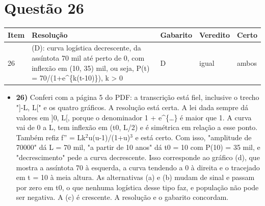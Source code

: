 \documentclass{article}%
\begin{document}
\section*{Questão 26}%
\begin{longtable}{@{}p{} p{} p{} p{} p{}@{}}\toprule Item & Resolução & Gabarito & Veredito & Certo \\ \midrule
26 & (D): curva logística decrescente, da assíntota 70 mil até perto de 0, com inflexão em (10, 35) mil, ou seja, P(t) = 70/(1+e\^{}\{k(t-10)\}), k > 0 & D & igual & ambos \\
\bottomrule\end{longtable}%
\begin{itemize}%
\item%
\textbf{26)} Conferi com a página 5 do PDF: a transcrição está fiel, inclusive o trecho "{]}-L, L{[}" e os quatro gráficos. A resolução está certa. A lei dada sempre dá valores em {]}0, L{[}, porque o denominador 1 + e\^{}\{\ldots{}\} é maior que 1. A curva vai de 0 a L, tem inflexão em (t0, L/2) e é simétrica em relação a esse ponto. Também refiz f'' = Lk$^2$u(u-1)/(1+u)$^3$ e está certo. Com isso, "amplitude de 70000" dá L = 70 mil, "a partir de 10 anos" dá t0 = 10 com P(10) = 35 mil, e "decrescimento" pede a curva decrescente. Isso corresponde ao gráfico (d), que mostra a assíntota 70 à esquerda, a curva tendendo a 0 à direita e o tracejado em t = 10 à meia altura. As alternativas (a) e (b) mudam de sinal e passam por zero em t0, o que nenhuma logística desse tipo faz, e população não pode ser negativa. A (c) é crescente. A resolução e o gabarito concordam.%
\end{itemize}%
\end{document}
